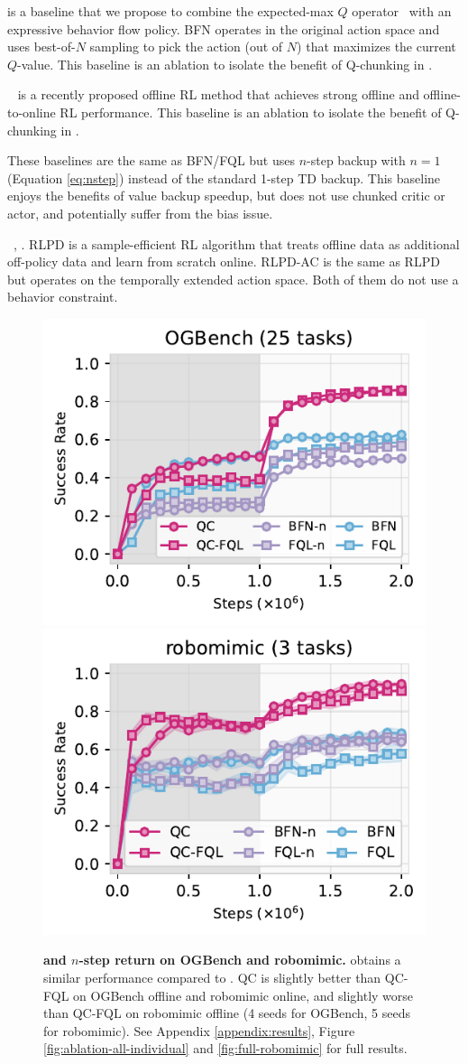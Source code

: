  is a baseline that we propose to combine the expected-max $Q$ operator~\citep{ghasemipour2021emaq} with an expressive behavior flow policy. BFN operates in the original action space and uses best-of-$N$ sampling to pick the action (out of $N$) that maximizes the current $Q$-value. This baseline is an ablation to isolate the benefit of Q-chunking in .

~\citep{park2025flow} is a recently proposed offline RL method that achieves strong offline and offline-to-online RL performance.
This baseline is an ablation to isolate the benefit of Q-chunking in .

 These baselines are the same as BFN/FQL but uses $n$-step backup with $n=1$ (Equation \ref{eq:nstep}) instead of the standard 1-step TD backup. This baseline enjoys the benefits of value backup speedup, but does not use chunked critic or actor, and potentially suffer from the bias issue.

~\citep{ball2023efficient}, . RLPD is a sample-efficient RL algorithm that treats offline data as additional off-policy data and learn from scratch online.
RLPD-AC is the same as RLPD but operates on the temporally extended action space. Both of them do not use a behavior constraint.


\begin{figure}
    \centering
    \includegraphics[width=0.48\linewidth]{figures/agg.pdf}
    \hfill
    \includegraphics[width=0.48\linewidth]{figures/robomimic-agg.pdf}
    \caption{\footnotesize \textbf{ and $n$-step return on OGBench and robomimic.}  obtains a similar performance compared to . QC is slightly better than QC-FQL on OGBench offline and robomimic online, and slightly worse than QC-FQL on robomimic offline (4 seeds for OGBench, 5 seeds for robomimic). See Appendix \ref{appendix:results}, Figure \ref{fig:ablation-all-individual} and \ref{fig:full-robomimic} for full results.}
    \label{fig:ablation}
\end{figure}

